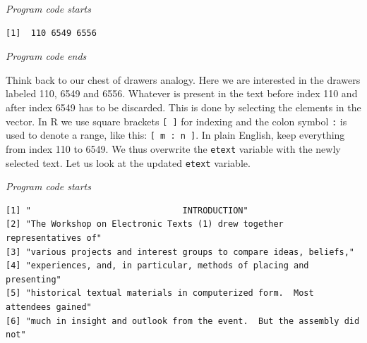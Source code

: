 \emph{Program code starts}

\begin{Shaded}
\begin{Highlighting}[]
\CommentTok{\textquotesingle{}}
\OtherTok{\textless{}{-}} \NormalTok{(}\SpecialCharTok{\textbackslash{}\textbackslash{}}\SpecialCharTok{\textbackslash{}\textbackslash{}}\SpecialCharTok{\textbackslash{}\textbackslash{}}\SpecialCharTok{\textbackslash{}\textbackslash{}}
\end{Highlighting}
\end{Shaded}

\begin{verbatim}
[1]  110 6549 6556
\end{verbatim}

\emph{Program code ends}

Think back to our chest of drawers analogy. Here we are interested in the drawers labeled 110, 6549 and 6556. Whatever is
present in the text before index 110 and after index 6549 has to be
discarded. This is done by selecting the elements in the vector. In R we
use square brackets \texttt{{[}\ {]}} for indexing and the colon symbol
\texttt{:} is used to denote a range, like this:
\texttt{{[}\ m\ :\ n\ {]}}. In plain English, keep everything from index
110 to 6549. We thus overwrite the \texttt{etext} variable with the
newly selected text. Let us look at the updated \texttt{etext} variable.

\emph{Program code starts}

\begin{Shaded}
\begin{Highlighting}[]
\OtherTok{\textless{}{-}}\NormalTok{ etext[keyword\_indices[}\NormalTok{]}\SpecialCharTok{:}\NormalTok{keyword\_indices[}\NormalTok{]]}
\end{Highlighting}
\end{Shaded}

\begin{verbatim}
[1] "                              INTRODUCTION"                               
[2] "The Workshop on Electronic Texts (1) drew together representatives of"    
[3] "various projects and interest groups to compare ideas, beliefs,"          
[4] "experiences, and, in particular, methods of placing and presenting"       
[5] "historical textual materials in computerized form.  Most attendees gained"
[6] "much in insight and outlook from the event.  But the assembly did not"    
\end{verbatim}

